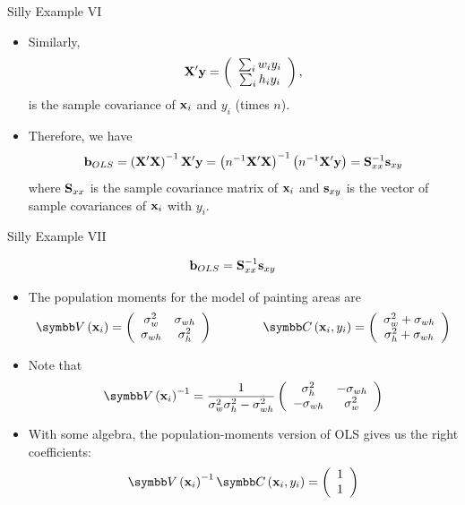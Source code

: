 \documentclass[aspectratio=169,11pt]{beamer}
\begin{document}
\begin{frame}{Silly Example VI}

	\begin{itemize}
	\item Similarly,
\[
{\bf X}'{\bf y}=\left(\begin{array}{c}
\sum_{i} w_{i}y_{i}\\
\sum_{i} h_{i}y_{i}
\end{array}\right),
\]
is the sample covariance of ${\bf x}_{i}$ and $y_{i}$
(times $n$). 

\smallskip
\item Therefore, we have
\[
{\bf b}_{OLS}=\left({\bf X}'{\bf X}\right)^{-1}{\bf X}'{\bf y}=\left(n^{-1}{\bf X}'{\bf X}\right)^{-1}\left(n^{-1}{\bf X}'{\bf y}\right)={\bf S}_{xx}^{-1}{\bf s}_{xy}
\]
where ${\bf S}_{xx}$ is the sample covariance matrix of ${\bf x}_{i}$
and ${\bf s}_{xy}$ is the vector of sample covariances of ${\bf x}_{i}$ with $y_{i}$. 

\end{itemize}
\end{frame}


\begin{frame}{Silly Example VII}

\[
{\bf b}_{OLS}={\bf S}_{xx}^{-1}{\bf s}_{xy}
\]

\begin{itemize}
	\item The population moments for the model of painting areas are \[
\Var\left({\bf x}_{i}\right)=\left(\begin{array}{cc}
\sigma_{w}^{2} & \sigma_{wh}\\
\sigma_{wh} & \sigma_{h}^{2}
\end{array}\right)\qquad\qquad \Cov\left({\bf x}_{i},y_{i}\right)=\left(\begin{array}{c}
\sigma_{w}^{2}+\sigma_{wh}\\
\sigma_{h}^{2}+\sigma_{wh}
\end{array}\right)
\]

\item Note that 
\[
\Var\left({\bf x}_{i}\right)^{-1}=\frac{1}{\sigma_{w}^{2}\sigma_{h}^{2}-\sigma_{wh}^{2}}\left(\begin{array}{cc}
\sigma_{h}^{2} & -\sigma_{wh}\\
-\sigma_{wh} & \sigma_{w}^{2}
\end{array}\right)
\]

\item With some algebra, the population-moments version of OLS gives us the right coefficients:
\[
\Var\left({\bf x}_{i}\right)^{-1}\Cov\left({\bf x}_{i},y_{i}\right)=\left(\begin{array}{c}
1\\
1
\end{array}\right)
\]
\end{itemize}
\end{frame}
\end{document}
